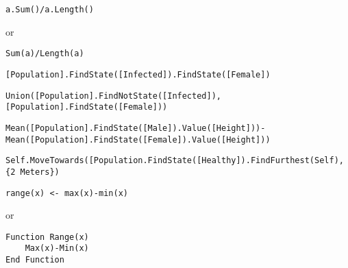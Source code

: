 \documentclass[]{memoir}
\begin{document}
\lstinline!a.Sum()/a.Length()!

or

\lstinline!Sum(a)/Length(a)!


\lstinline![Population].FindState([Infected]).FindState([Female])!


\lstinline!Union([Population].FindNotState([Infected]), [Population].FindState([Female]))!


\lstinline!Mean([Population].FindState([Male]).Value([Height]))-Mean([Population].FindState([Female]).Value([Height]))!


\lstinline!Self.MoveTowards([Population.FindState([Healthy]).FindFurthest(Self), {2 Meters})!


\lstinline!range(x) <- max(x)-min(x)!

or

\begin{lstlisting}
Function Range(x)
    Max(x)-Min(x)
End Function
\end{lstlisting}

\end{document}
